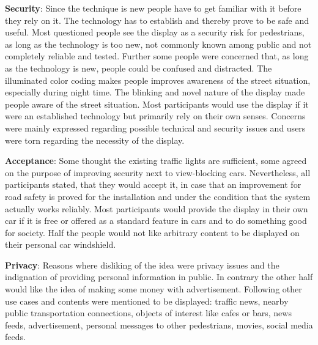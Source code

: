 \textbf{Security}: Since the technique is new people have to get familiar with it before they rely on it. The technology has to establish and thereby prove to be safe and useful. Most questioned people see the display as a security risk for pedestrians, as long as the technology is too new, not commonly known among public and not completely reliable and tested. Further some people were concerned that, as long as the technology is new, people could be confused and distracted. The illuminated color coding makes people improves awareness of the street situation, especially during night time. The blinking and novel nature of the display made people aware of the street situation. Most participants would use the display if it were an established technology but primarily rely on their own senses. Concerns were mainly expressed regarding possible technical and security issues and users were torn regarding the necessity of the display. 

\textbf{Acceptance}: Some thought the existing traffic lights are sufficient, some agreed on the purpose of improving security next to view-blocking cars. Nevertheless, all participants stated, that they would accept it, in case that an improvement for road safety is proved for the installation and under the condition that the system actually works reliably. Most participants would provide the display in their own car if it is free or offered as a standard feature in cars and to do something good for society. Half the people would not like arbitrary content to be displayed on their personal car windshield.

\textbf{Privacy}: Reasons where disliking of the idea were privacy issues and the indignation of providing personal information in public. In contrary the other half would like the idea of making some money with advertisement. Following other use cases and contents were mentioned to be displayed: traffic news, nearby public transportation connections, objects of interest like cafes or bars, news feeds, advertisement, personal messages to other pedestrians, movies, social media feeds.
